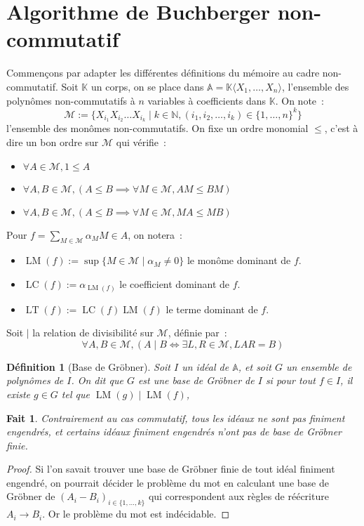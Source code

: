 \documentclass{article}
\newtheorem*{fact}{Fait}
\newtheorem*{dfn}{Définition}
\newcommand{\N}{\mathbb{N}}
\newcommand{\K}{\mathbb{K}}
\newcommand{\chev}[1]{\langle #1 \rangle}
\newcommand{\A}{\mathbb{A}}
\newcommand{\M}{\mathcal{M}}
\DeclareMathOperator{\LM}{LM}
\DeclareMathOperator{\LC}{LC}
\DeclareMathOperator{\LT}{LT}
\begin{document}
\section*{Algorithme de Buchberger non-commutatif}
Commençons par adapter les différentes définitions du mémoire au cadre non-commutatif.
Soit $\K$ un corps, on se place dans $\A = \K \chev{X_1, \dots, X_n}$, l'ensemble des polynômes non-commutatifs à $n$ variables à coefficients dans $\K$. On note~: 
$$\M := \{X_{i_1}X_{i_2} \dots X_{i_k} \;|\; k \in \N, (i_1, i_2, \dots, i_k) \in \{1, \dots, n\}^k \}$$
l'ensemble des monômes non-commutatifs. On fixe un ordre monomial $\leq$, c'est à dire un bon ordre sur $\M$ qui vérifie~:
\begin{itemize}
\item $\forall A \in \M, 1 \leq A$
\item $\forall A, B \in \M, (A \leq B \implies \forall M \in \M, AM \leq BM)$
\item $\forall A, B \in \M, (A \leq B \implies \forall M \in \M, MA \leq MB)$
\end{itemize}
Pour $f = \sum_{M \in \M} \alpha_M M \in A$, on notera~:
\begin{itemize}
\item $\LM(f) := \sup \{ M \in \M \;|\; \alpha_M \neq 0 \}$ le monôme dominant de $f$.
\item $\LC(f) := \alpha_{\LM(f)}$ le coefficient dominant de $f$.
\item $\LT(f) := \LC(f)\LM(f)$ le terme dominant de $f$.
\end{itemize}
Soit $|$ la relation de divisibilité sur $\M$, définie par~:
$$\forall A, B \in \M, (A \;|\; B \iff \exists L, R \in \M, LAR = B)$$

\begin{dfn}[Base de Gröbner]
	Soit $I$ un idéal de $\A$, et soit $G$ un ensemble de polynômes de $I$.
	On dit que $G$ est une base de Gröbner de $I$ si pour tout $f \in I$, il existe $g \in G$ tel que $\LM(g) \;|\; \LM(f)$, 
\end{dfn}

\begin{fact}
	Contrairement au cas commutatif, tous les idéaux ne sont pas finiment engendrés, et certains idéaux finiment engendrés n'ont pas de base de Gröbner finie.
\end{fact}
\begin{proof}
	Si l'on savait trouver une base de Gröbner finie de tout idéal finiment engendré, on pourrait décider le problème du mot en calculant une base de Gröbner de $(A_i - B_i)_{i \in \{1, \dots, k\}}$ qui correspondent aux règles de réécriture $A_i \rightarrow B_i$. 
	Or le problème du mot est indécidable.
\end{proof}
\end{document}

